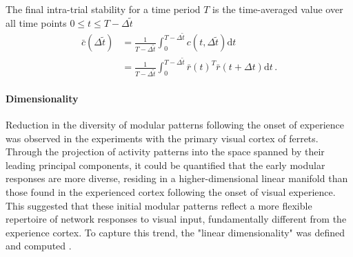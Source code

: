 \documentclass[11pt]{article}
\begin{document}
	The final intra-trial stability for a time period $T$ is the time-averaged value over all time points $0 \leq t \leq T - \Delta \tilde{t}$
		\begin{equation} \label{eq:its_sym}
			\begin{split}
				\bar{c}{(\Delta \tilde{t})} &= \frac{1}{T-\Delta \tilde{t}} \int_{0}^{T-\Delta \tilde{t}} c(t, \Delta \tilde{t}) \mathrm{d} t\\
				                            &= \frac{1}{T-\Delta \tilde{t}} \int_{0}^{T-\Delta \tilde{t}} \bar{r}(t)^T \bar{r}(t + \Delta t) \mathrm{d} t \, .
			\end{split} 
		\end{equation}
	
	\paragraph{Dimensionality}
	
	Reduction in the diversity of modular patterns following the onset of experience was observed in the experiments with the primary visual cortex of ferrets. Through the projection of activity patterns into the space spanned by their leading principal components, it could be quantified that the early modular responses are more diverse, residing in a higher-dimensional linear manifold than those found in the experienced cortex following the onset of visual experience. This suggested that these initial modular patterns reflect a more flexible repertoire of network responses to visual input, fundamentally different from the experience cortex. To capture this trend, the "linear dimensionality" was defined and computed \cite{tragenap2023nature}. 
	
\end{document}
